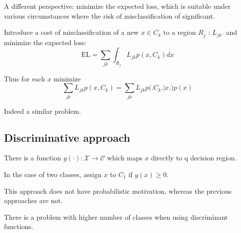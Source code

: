 \documentclass[a4paper]{article}
\newcommand{\Ccal}{\mathcal{C}}
\begin{document}
A different perspective: minimize the expected loss, which is suitable under various circumstances where the risk of misclassification of significant.

Introduce a cost of misclassification of a new $x\in C_k$ to a region $R_j$ : $L_{jk}$.
and minimize the expected loss:
\[\text{EL} = \sum_{jk} \int_{R_j} L_{jk} p(x, C_k) dx\]

Thus for each $x$ minimize 
\[\sum_{jk} L_{jk} p(x, C_k) = \sum_{jk} L_{jk} p\big(\big. C_k\big.\big\rvert x\big.\big) p(x)\]

Indeed a similar problem.

\subsection{Discriminative approach} %
\label{sub:discriminative_approach}

There is a function $y(\cdot):\mathcal{X}\to \Ccal$ which maps $x$ directly to q decision region.

In the case of two classes, assign $x$ to $C_1$ if $y(x) \geq 0$.

This approach does not have probabilistic motivation, whereas the previous approaches are not.

There is a problem with higher number of classes when using discriminant functions.
\end{document}
